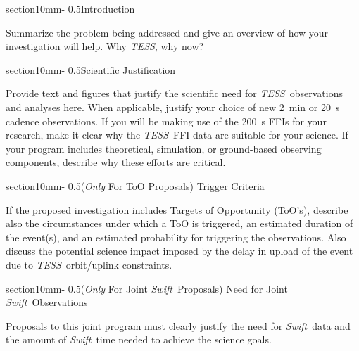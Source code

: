 \documentclass[letterpaper,12pt]{article}
\makeatletter
\renewcommand{\section}{\@startsection%
{section}{1}{0mm}{-\baselineskip}%
{0.5\baselineskip}{\normalfont\Large\bfseries}}%
\newcommand{\tess}{{\it TESS}}
\newcommand{\swift}{{\it Swift}}
\makeatother
\begin{document}
\section{Introduction}

Summarize the problem being addressed and give an overview of how your investigation will help. 
Why \tess, why now?

\section{Scientific Justification}

Provide text and figures that justify the scientific need for \tess\ observations and analyses here. When applicable, justify your choice of new 2~min or 20~s cadence observations. 
If you will be making use of the 200~s FFIs for your research, make it clear why the \tess\ FFI data are suitable for your science.
If your program includes theoretical, simulation, or ground-based observing components, describe why these efforts are critical.


\section{({\it Only} For ToO Proposals) Trigger Criteria}

If the proposed investigation includes Targets of Opportunity (ToO's), describe also the circumstances 
under which a ToO is triggered, an estimated duration of the event(s), and an estimated probability for 
triggering the observations. Also discuss the potential science impact imposed by the delay in upload 
of the event due to \tess\ orbit/uplink constraints.


\section{({\it Only} For Joint \swift\ Proposals) Need for Joint \swift\ Observations}

Proposals to this joint program must clearly justify the need for \swift\ data and the amount of \swift\ time needed to achieve the science goals.\\
\end{document}
